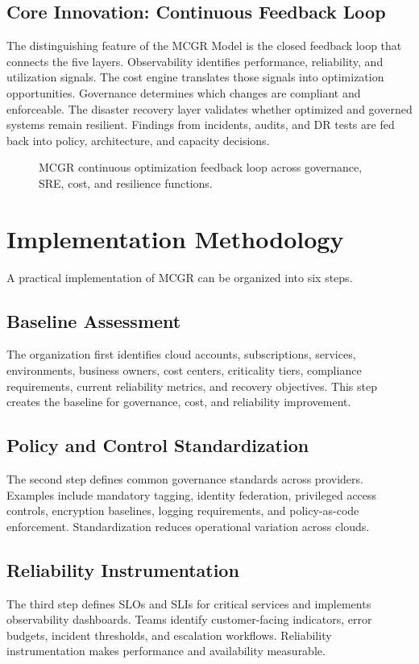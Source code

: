 \documentclass[conference]{IEEEtran}
\begin{document}
\subsection{Core Innovation: Continuous Feedback Loop}
The distinguishing feature of the MCGR Model is the closed feedback loop that connects the five layers. Observability identifies performance, reliability, and utilization signals. The cost engine translates those signals into optimization opportunities. Governance determines which changes are compliant and enforceable. The disaster recovery layer validates whether optimized and governed systems remain resilient. Findings from incidents, audits, and DR tests are fed back into policy, architecture, and capacity decisions.

\begin{figure}[!t]
\centering

\caption{MCGR continuous optimization feedback loop across governance, SRE, cost, and resilience functions.}
\label{fig:mcgr_loop}
\end{figure}

\section{Implementation Methodology}
A practical implementation of MCGR can be organized into six steps.

\subsection{Baseline Assessment}
The organization first identifies cloud accounts, subscriptions, services, environments, business owners, cost centers, criticality tiers, compliance requirements, current reliability metrics, and recovery objectives. This step creates the baseline for governance, cost, and reliability improvement.

\subsection{Policy and Control Standardization}
The second step defines common governance standards across providers. Examples include mandatory tagging, identity federation, privileged access controls, encryption baselines, logging requirements, and policy-as-code enforcement. Standardization reduces operational variation across clouds.

\subsection{Reliability Instrumentation}
The third step defines SLOs and SLIs for critical services and implements observability dashboards. Teams identify customer-facing indicators, error budgets, incident thresholds, and escalation workflows. Reliability instrumentation makes performance and availability measurable.
\end{document}
